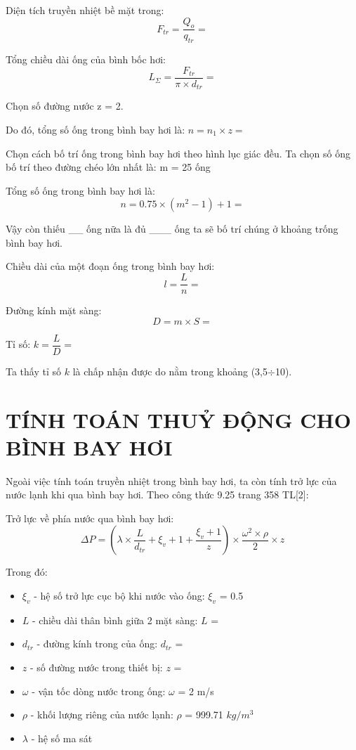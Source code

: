 Diện tích truyền nhiệt bề mặt trong:
\begin{equation*}
	F_{tr} = \dfrac{Q_{o}}{q_{tr}} =  
\end{equation*}

Tổng chiều dài ống của bình bốc hơi:
\begin{equation*}
	L_{\Sigma} = \dfrac{F_{tr}}{\pi\times d_{tr}} =  
\end{equation*}

Chọn số đường nước z = 2.

Do đó, tổng số ống trong bình bay hơi là: $n = n_{1}\times z =$ 

Chọn cách bố trí ống trong bình bay hơi theo hình lục giác đều. Ta chọn số ống bố trí theo đường chéo lớn nhất là: m = 25 ống

Tổng số ống trong bình bay hơi là:
\begin{equation*}
	n = 0.75\times(m^2 - 1) + 1 = 
\end{equation*}

Vậy còn thiếu \_\_ ống nữa là đủ \_\_\_ ống ta sẽ bố trí chúng ở khoảng trống bình bay hơi.

Chiều dài của một đoạn ống trong bình bay hơi:
\begin{equation*}
	l = \dfrac{L}{n} = 
\end{equation*}

Đường kính mặt sàng:
\begin{equation*}
	D = m\times S = 
\end{equation*}

Tỉ số: $k = \dfrac{L}{D} = $

Ta thấy tỉ số $k$ là chấp nhận được do nằm trong khoảng (3,5$\div$10).

\section{TÍNH TOÁN THUỶ ĐỘNG CHO BÌNH BAY HƠI}
Ngoài việc tính toán truyền nhiệt trong bình bay hơi, ta còn tính trở lực của nước lạnh khi qua bình bay hơi. Theo công thức 9.25 trang 358 TL[2]:

Trở lực về phía nước qua bình bay hơi:
\begin{equation*}
	\Delta P = \left(\lambda\times\dfrac{L}{d_{tr}} +\xi_{v} + 1 + \dfrac{\xi_{v} + 1}{z}\right)\times \dfrac{\omega^2\times\rho}{2}\times z
\end{equation*}

Trong đó:
\begin{itemize}
	\item $\xi_{v}$ - hệ số trở lực cục bộ khi nước vào ống: $\xi_{v}$ = 0.5
	\item $L$ - chiều dài thân bình giữa 2 mặt sàng: $L$ = 
	\item $d_{tr}$ - đường kính trong của ống: $d_{tr}$ =
	\item $z$ - số đường nước trong thiết bị: $z$ = 
	\item $\omega$ - vận tốc dòng nước trong ống: $\omega$ = 2 m/s
	\item $\rho$ - khối lượng riêng của nước lạnh: $\rho$ = 999.71 $kg/m^3$
	\item $\lambda$ - hệ số ma sát	
\end{itemize}

